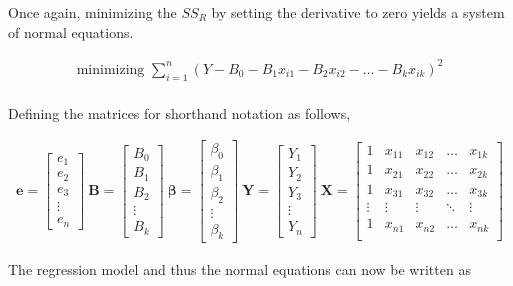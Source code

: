 Once again, minimizing the $ SS_R $ by setting the derivative to zero yields a system of normal equations.

\begin{align}
	\text{minimizing }\sum\limits_{i = 1}^n (Y - B_0 - B_1 x_{i1} - B_2 x_{i2} - \dots - B_k x_{ik})^2 \nonumber \\
\end{align}

Defining the matrices for shorthand notation as follows,

\begin{align}
	\textbf{e} = 
	\begin{bmatrix}
		e_1 \\
		e_2 \\
		e_3 \\
		\vdots \\
		e_n
	\end{bmatrix}
	\ \textbf{B} = 
	\begin{bmatrix}
		B_0 \\
		B_1 \\
		B_2 \\
		\vdots \\
		B_k
	\end{bmatrix}
	\ \boldsymbol{\beta} = 
	\begin{bmatrix}
		\beta_0 \\
		\beta_1 \\
		\beta_2 \\
		\vdots \\
		\beta_k
	\end{bmatrix}
	\ \textbf{Y} = 
	\begin{bmatrix}
		Y_1 \\
		Y_2 \\
		Y_3 \\
		\vdots \\
		Y_n
	\end{bmatrix}
	\ \textbf{X} = 
	\begin{bmatrix}
		1 & x_{11} & x_{12} & \dots & x_{1k}\\
		1 & x_{21} & x_{22} & \dots & x_{2k}\\
		1 & x_{31} & x_{32} & \dots & x_{3k}\\
		\vdots & \vdots & \vdots & \ddots & \vdots \\
		1 & x_{n1} & x_{n2} & \dots & x_{nk}\\
	\end{bmatrix} 
\end{align}

The regression model and thus the normal equations can now be written as

